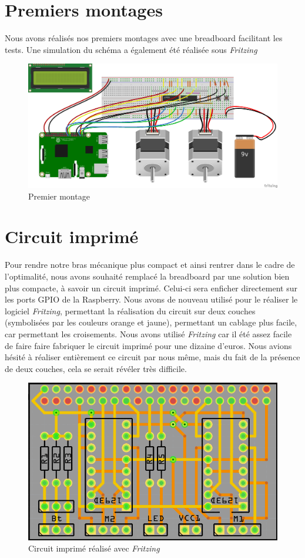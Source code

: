 \documentclass[12pt,a4paper]{report}
\begin{document}
\section{Premiers montages}
Nous avons réalisés nos premiers montages avec une breadboard facilitant les tests. Une simulation du schéma a également été réalisée sous \emph{Fritzing}
\begin{figure}[!h]
 \center
 \includegraphics[scale=0.45]{../pictures/Sudoku_schema}
 \caption{Premier montage}
\end{figure}

\section{Circuit imprimé}
Pour rendre notre bras mécanique plus compact et ainsi rentrer dans le cadre de l'optimalité, nous avons souhaité remplacé la breadboard par une solution bien plus compacte, à savoir un circuit imprimé. Celui-ci sera enficher directement sur les ports GPIO de la Raspberry. Nous avons de nouveau utilisé pour le réaliser le logiciel \emph{Fritzing}, permettant la réalisation du circuit sur deux couches (symbolisées par les couleurs orange et jaune), permettant un cablage plus facile, car permettant les croisements. Nous avons utilisé \emph{Fritzing} car il été assez facile de faire faire fabriquer le circuit imprimé pour une dizaine d'euros. Nous avions hésité à réaliser entièrement ce circuit par nous même, mais du fait de la présence de deux couches, cela se serait révéler très difficile.

\begin{figure}[!h]
 \center
 \includegraphics[scale=0.5]{../pictures/Sudoku_circuit_imprime.png}
 \caption{Circuit imprimé réalisé avec \emph{Fritzing}}
\end{figure}
\end{document}

